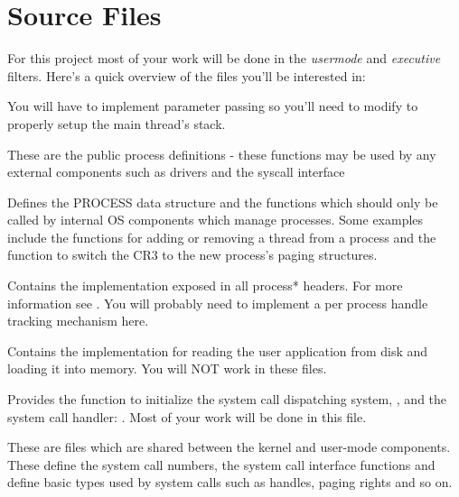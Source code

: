 \section{Source Files}

For this project most of your work will be done in the \textit{usermode} and \textit{executive}
filters. Here's a quick overview of the files you'll be interested in:


You will have to implement parameter passing so you'll need to modify 
 to properly setup the main thread's stack.



These are the public process definitions - these functions may be used by any external components
such as drivers and the syscall interface


Defines the PROCESS data structure and the functions which should only be called by internal OS
components which manage processes. Some examples include the functions for adding or removing a
thread from a process and the function to switch the CR3 to the new process’s paging structures.


Contains the implementation exposed in all process* headers. For more information see
. You will probably need to implement a per process handle tracking
mechanism here.



Contains the implementation for reading the user application from disk and loading it into memory.
You will NOT work in these files.



Provides the function to initialize the system call dispatching system, , and
the system call handler: . Most of your work will be done in this file.




These are files which are shared between the kernel and user-mode components. These define the
system call numbers, the system call interface functions and define basic types used by system
calls such as handles, paging rights and so on.

